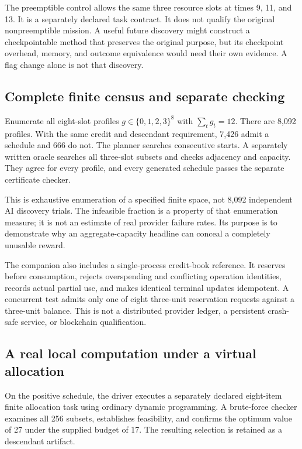 \documentclass[11pt,letterpaper]{article}
\theoremstyle{remark}\newtheorem{remark}{Remark}[section]
\begin{document}
The preemptible control allows the same three resource slots at times 9, 11, and 13. It is a separately declared task contract. It does not qualify the original nonpreemptible mission. A useful future discovery might construct a checkpointable method that preserves the original purpose, but its checkpoint overhead, memory, and outcome equivalence would need their own evidence. A flag change alone is not that discovery.

\subsection{Complete finite census and separate checking}
Enumerate all eight-slot profiles $g\in\{0,1,2,3\}^{8}$ with $\sum_tg_t=12$. There are 8,092 profiles. With the same credit and descendant requirement, 7,426 admit a schedule and 666 do not. The planner searches consecutive starts. A separately written oracle searches all three-slot subsets and checks adjacency and capacity. They agree for every profile, and every generated schedule passes the separate certificate checker.

This is exhaustive enumeration of a specified finite space, not 8,092 independent AI discovery trials. The infeasible fraction is a property of that enumeration measure; it is not an estimate of real provider failure rates. Its purpose is to demonstrate why an aggregate-capacity headline can conceal a completely unusable reward.

The companion also includes a single-process credit-book reference. It reserves before consumption, rejects overspending and conflicting operation identities, records actual partial use, and makes identical terminal updates idempotent. A concurrent test admits only one of eight three-unit reservation requests against a three-unit balance. This is not a distributed provider ledger, a persistent crash-safe service, or blockchain qualification.

\subsection{A real local computation under a virtual allocation}
On the positive schedule, the driver executes a separately declared eight-item finite allocation task using ordinary dynamic programming. A brute-force checker examines all 256 subsets, establishes feasibility, and confirms the optimum value of 27 under the supplied budget of 17. The resulting selection is retained as a descendant artifact.
\end{document}
